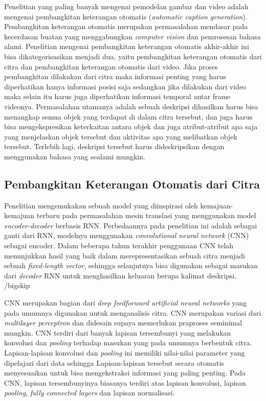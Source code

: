 Penelitian yang paling banyak mengenai pemodelan gambar dan video adalah mengenai pembangkitan keterangan otomatis (\textit{automatic caption generation}). Pembangkitan keterangan otomatis merupakan permasalahan mendasar pada kecerdasan buatan yang menggabungkan \textit{computer vision} dan pemrosesan bahasa alami. Penelitian mengenai pembangkitan keterangan otomatis akhir-akhir ini bisa dikategorisasikan menjadi dua, yaitu pembangkitan keterangan otomatis dari citra dan pembangkitan keterangan otomatis dari video. Jika proses pembangkitan dilakukan dari citra maka informasi penting yang harus diperhatikan hanya informasi posisi saja sedangkan jika dilakukan dari video maka selain itu harus juga diperhatikan informasi temporal antar frame videonya. Permasalahan utamanya adalah sebuah deskripsi dihasilkan harus bisa menangkap semua objek yang terdapat di dalam citra tersebut, dan juga harus bisa mengekspresikan keterkaitan antara objek dan juga atribut-atribut apa saja yang menjelaskan objek tersebut dan aktivitas apa yang melibatkan objek tersebut. Terlebih lagi, deskripsi tersebut harus dideskripsikan dengan menggunakan bahasa yang sealami mungkin.


\subsection{Pembangkitan Keterangan Otomatis dari Citra}

Penelitian \textcite{Vinyals2014} mengemukakan sebuah model yang diinspirasi oleh kemajuan-kemajuan terbaru pada permasalahan mesin translasi yang menggunakan model \textit{encoder-decoder} berbasis RNN. Perbedaannya pada penelitian ini adalah sebagai ganti dari RNN, modelnya menggunakan \textit{convolutional neural network} (CNN) sebagai encoder. Dalam beberapa tahun terakhir penggunaan CNN telah menunjukkan hasil yang baik dalam merepresentasikan sebuah citra menjadi sebuah \textit{fixed-length vector}, sehingga selanjutnya bisa digunakan sebagai masukan dari \textit{decoder} RNN untuk menghasilkan keluaran berupa kalimat deskripsi.
/bigskip

CNN merupakan bagian dari \textit{deep feedforward artificial neural networks} yang pada umumnya digunakan untuk menganalisis citra. CNN merupakan variasi dari \textit{multilayer perceptron} dan didesain supaya memerlukan praproses seminimal mungkin. CNN terdiri dari banyak lapisan tersembunyi yang melakukan konvolusi dan \textit{pooling} terhadap masukan yang pada umumnya berbentuk citra. Lapisan-lapisan konvolusi dan \textit{pooling} ini memiliki nilai-nilai parameter yang dipelajari dari data sehingga Lapisan-lapisan tersebut secara otomatis menyesuaikan untuk bisa mengekstraksi informasi yang paling penting. Pada CNN, lapisan tersembunyinya biasanya terdiri atas lapisan konvolusi, lapisan \textit{pooling}, \textit{fully connected layers} dan lapisan normalisasi. 
\bigskip

